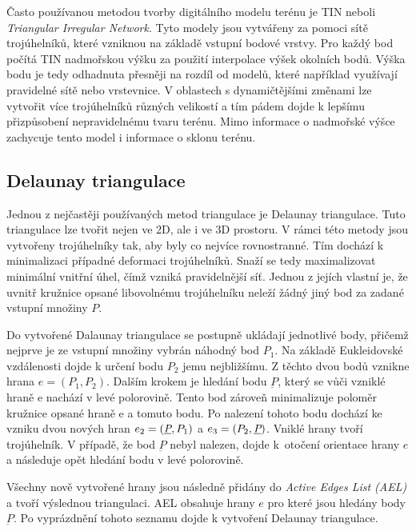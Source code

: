\documentclass{article}
\begin{document}
\begin{spacing}{1.5}
Často používanou metodou tvorby digitálního modelu terénu je TIN neboli \textit{Triangular Irregular Network}. Tyto modely jsou vytvářeny za pomoci sítě trojúhelníků, které vzniknou na základě vstupní bodové vrstvy. Pro každý bod počítá TIN nadmořskou výšku za použití interpolace výšek okolních bodů. Výška bodu je tedy odhadnuta přesněji na rozdíl od modelů, které například využívají pravidelné sítě nebo vrstevnice. V oblastech s dynamičtějšími změnami lze vytvořit více trojúhelníků různých velikostí a tím pádem dojde k lepšímu přizpůsobení nepravidelnému tvaru terénu. Mimo informace o nadmořské výšce zachycuje tento model i informace o sklonu terénu.

\subsection{Delaunay triangulace}
Jednou z nejčastěji používaných metod triangulace je Delaunay triangulace. Tuto triangulace lze tvořit nejen ve 2D, ale i ve 3D prostoru. V rámci této metody jsou vytvořeny trojúhelníky tak, aby byly co nejvíce rovnostranné. Tím dochází k minimalizaci případné deformaci trojúhelníků. Snaží se tedy maximalizovat minimální vnitřní úhel, čímž vzniká pravidelnější síť. Jednou z jejích vlastní je, že uvnitř kružnice opsané libovolnému trojúhelníku neleží žádný jiný bod za zadané vstupní množiny $P$.

Do vytvořené Dalaunay triangulace se postupně ukládají jednotlivé body, přičemž nejprve je ze vstupní množiny vybrán náhodný bod $P_1$. Na základě Eukleidovské vzdálenosti dojde k určení bodu $P_2$ jemu nejbližšímu. Z těchto dvou bodů vznikne hrana $e = (P_1, P_2)$. Dalším krokem je hledání bodu \textit{$\underbar{P}$}, který se vůči vzniklé hraně e nachází v levé polorovině. Tento bod zároveň minimalizuje poloměr kružnice opsané hraně e a tomuto bodu. Po nalezení tohoto bodu dochází ke vzniku dvou nových hran $e_2 = (\textit{\underbar{P}}, P_1)$ a $e_3 = (P_2, \textit{\underbar{P}})$. Vniklé hrany tvoří trojúhelník. V případě, že bod \textit{$\underbar{P}$} nebyl nalezen, dojde k~otočení orientace hrany $e$ a následuje opět hledání bodu v levé polorovině.

Všechny nově vytvořené hrany jsou následně přidány do \textit{Active Edges List (AEL)} a tvoří výslednou triangulaci. AEL obsahuje hrany $e$ pro které jsou hledány body \textit{$\underbar{P}$}. Po vyprázdnění tohoto seznamu dojde k vytvoření Delaunay triangulace. 

\newpage


\end{spacing}
\end{document}
